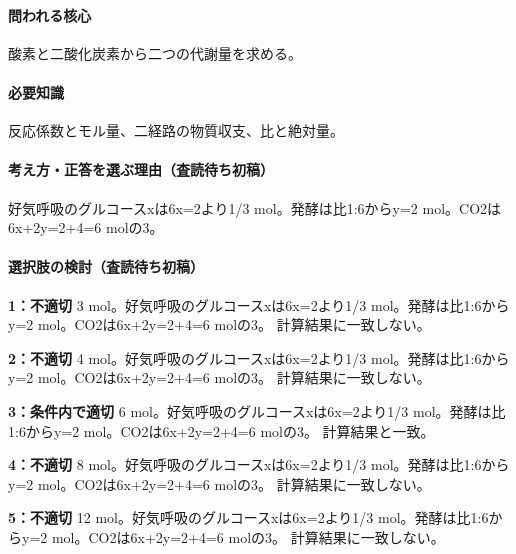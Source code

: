 \paragraph{問われる核心} 酸素と二酸化炭素から二つの代謝量を求める。

\paragraph{必要知識} 反応係数とモル量、二経路の物質収支、比と絶対量。

\paragraph{考え方・正答を選ぶ理由（査読待ち初稿）} 好気呼吸のグルコースxは6x=\allowbreak{}2より1/3 mol。発酵は比1:6からy=\allowbreak{}2 mol。CO2は6x+2y=\allowbreak{}2+4=\allowbreak{}6 molの3。

\paragraph{選択肢の検討（査読待ち初稿）}\mbox{}\par

\noindent\textbf{1：不適切} 3 mol。好気呼吸のグルコースxは6x=\allowbreak{}2より1/3 mol。発酵は比1:6からy=\allowbreak{}2 mol。CO2は6x+2y=\allowbreak{}2+4=\allowbreak{}6 molの3。 計算結果に一致しない。\par

\noindent\textbf{2：不適切} 4 mol。好気呼吸のグルコースxは6x=\allowbreak{}2より1/3 mol。発酵は比1:6からy=\allowbreak{}2 mol。CO2は6x+2y=\allowbreak{}2+4=\allowbreak{}6 molの3。 計算結果に一致しない。\par

\noindent\textbf{3：条件内で適切} 6 mol。好気呼吸のグルコースxは6x=\allowbreak{}2より1/3 mol。発酵は比1:6からy=\allowbreak{}2 mol。CO2は6x+2y=\allowbreak{}2+4=\allowbreak{}6 molの3。 計算結果と一致。\par

\noindent\textbf{4：不適切} 8 mol。好気呼吸のグルコースxは6x=\allowbreak{}2より1/3 mol。発酵は比1:6からy=\allowbreak{}2 mol。CO2は6x+2y=\allowbreak{}2+4=\allowbreak{}6 molの3。 計算結果に一致しない。\par

\noindent\textbf{5：不適切} 12 mol。好気呼吸のグルコースxは6x=\allowbreak{}2より1/3 mol。発酵は比1:6からy=\allowbreak{}2 mol。CO2は6x+2y=\allowbreak{}2+4=\allowbreak{}6 molの3。 計算結果に一致しない。\par


